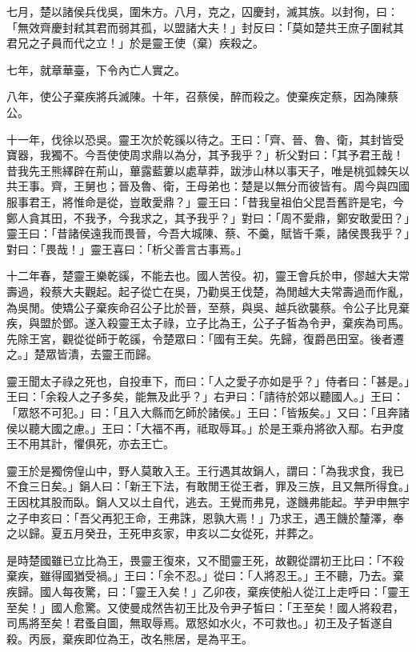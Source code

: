 \begin{pinyinscope}
七月，楚以諸侯兵伐吳，圍朱方。八月，克之，囚慶封，滅其族。以封徇，曰：「無效齊慶封弒其君而弱其孤，以盟諸大夫！」封反曰：「莫如楚共王庶子圍弒其君兄之子員而代之立！」於是靈王使（棄）疾殺之。

七年，就章華臺，下令內亡人實之。

八年，使公子棄疾將兵滅陳。十年，召蔡侯，醉而殺之。使棄疾定蔡，因為陳蔡公。

十一年，伐徐以恐吳。靈王次於乾豀以待之。王曰：「齊、晉、魯、衛，其封皆受寶器，我獨不。今吾使使周求鼎以為分，其予我乎？」析父對曰：「其予君王哉！昔我先王熊繹辟在荊山，蓽露藍蔞以處草莽，跋涉山林以事天子，唯是桃弧棘矢以共王事。齊，王舅也；晉及魯、衛，王母弟也：楚是以無分而彼皆有。周今與四國服事君王，將惟命是從，豈敢愛鼎？」靈王曰：「昔我皇祖伯父昆吾舊許是宅，今鄭人貪其田，不我予，今我求之，其予我乎？」對曰：「周不愛鼎，鄭安敢愛田？」靈王曰：「昔諸侯遠我而畏晉，今吾大城陳、蔡、不羹，賦皆千乘，諸侯畏我乎？」對曰：「畏哉！」靈王喜曰：「析父善言古事焉。」

十二年春，楚靈王樂乾豀，不能去也。國人苦役。初，靈王會兵於申，僇越大夫常壽過，殺蔡大夫觀起。起子從亡在吳，乃勸吳王伐楚，為閒越大夫常壽過而作亂，為吳閒。使矯公子棄疾命召公子比於晉，至蔡，與吳、越兵欲襲蔡。令公子比見棄疾，與盟於鄧。遂入殺靈王太子祿，立子比為王，公子子皙為令尹，棄疾為司馬。先除王宮，觀從從師于乾豀，令楚眾曰：「國有王矣。先歸，復爵邑田室。後者遷之。」楚眾皆潰，去靈王而歸。

靈王聞太子祿之死也，自投車下，而曰：「人之愛子亦如是乎？」侍者曰：「甚是。」王曰：「余殺人之子多矣，能無及此乎？」右尹曰：「請待於郊以聽國人。」王曰：「眾怒不可犯。」曰：「且入大縣而乞師於諸侯。」王曰：「皆叛矣。」又曰：「且奔諸侯以聽大國之慮。」王曰：「大福不再，祗取辱耳。」於是王乘舟將欲入鄢。右尹度王不用其計，懼俱死，亦去王亡。

靈王於是獨傍偟山中，野人莫敢入王。王行遇其故鋗人，謂曰：「為我求食，我已不食三日矣。」鋗人曰：「新王下法，有敢閒王從王者，罪及三族，且又無所得食。」王因枕其股而臥。鋗人又以土自代，逃去。王覺而弗見，遂饑弗能起。芋尹申無宇之子申亥曰：「吾父再犯王命，王弗誅，恩孰大焉！」乃求王，遇王饑於釐澤，奉之以歸。夏五月癸丑，王死申亥家，申亥以二女從死，并葬之。

是時楚國雖已立比為王，畏靈王復來，又不聞靈王死，故觀從謂初王比曰：「不殺棄疾，雖得國猶受禍。」王曰：「余不忍。」從曰：「人將忍王。」王不聽，乃去。棄疾歸。國人每夜驚，曰：「靈王入矣！」乙卯夜，棄疾使船人從江上走呼曰：「靈王至矣！」國人愈驚。又使曼成然告初王比及令尹子皙曰：「王至矣！國人將殺君，司馬將至矣！君蚤自圖，無取辱焉。眾怒如水火，不可救也。」初王及子皙遂自殺。丙辰，棄疾即位為王，改名熊居，是為平王。


\end{pinyinscope}
